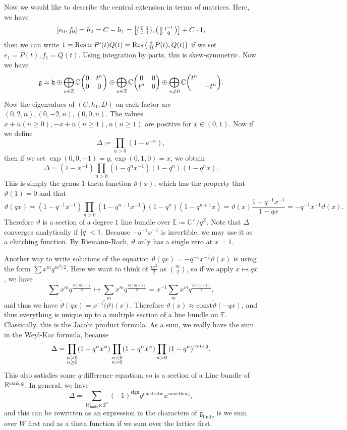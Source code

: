 \documentclass[leqno, openany]{memoir}
\theoremstyle{definition}
\theoremstyle{remark}
\theoremstyle{plain}
\theoremstyle{definition}
\theoremstyle{remark}
\newcommand{\C}{\mathbb{C}}
\newcommand{\Z}{\mathbb{Z}}
\newcommand{\E}{\mathbb{E}}
\newcommand{\mf}[1]{\mathfrak{#1}}
\newcommand{\mr}[1]{\mathrm{#1}}
\newcommand{\wtl}[1]{\widetilde{#1}}
\begin{document}
Now we would like to describe the central extension in terms of matrices. Here, we have
\[ [e_0, f_0] = h_0 = C - h_1 = \qty[ \begin{psmallmatrix} 0 & 0 \\ t & 0 \end{psmallmatrix}, \begin{psmallmatrix} 0 & t^{-1} \\ 0 & 0 \end{psmallmatrix}] + C \cdot 1, \]
then we can write $1 = \Res \tr P'(t) Q(t) = \Res \qty( \dv{t} P(t), Q(t) )$ if we set $e_1 = P(t), f_1 = Q(t)$. Using integration by parts, this is skew-symmetric. Now we have
\[ \mf{g} = \mf{h} \oplus \bigoplus_{n \in \Z} \C \mqty(0 & t^n \\ 0 & 0) \oplus \bigoplus_{n \in \Z} \C \mqty(0 & 0 \\ t^n & 0) \oplus \bigoplus_{n \neq 0} \C \mqty( \dmat{t^n,-t^n} ). \]
Now the eigenvalues of $(C, h_1, D)$ on each factor are $(0, 2,n), (0, -2, n), (0, 0,n)$. The values $x+n (n \geq 0), -x+n (n \geq 1), n (n \geq 1)$ are positive for $x \in (0,1)$. Now if we define
\[ \Delta \coloneqq \prod_{\alpha > 0} (1-e^{-\alpha}), \]
then if we set $\exp(0,0,-1) = q, \exp(0,1,0) = x$, we obtain
\[ \Delta = (1-x^{-1}) \prod_{n>0} (1-q^n x^{-1}) (1-q^n) (1-q^n x). \]
This is simply the genus $1$ theta function $\vartheta(x)$, which has the property that $\vartheta(1) = 0$ and that
\[ \vartheta(qx) = (1-q^{-1}x^{-1}) \prod_{n>0} (1-q^{n-1}x^{-1})(1-q^n)(1-q^{n+1}x) = \vartheta(x) \frac{1-q^{-1}x^{-1}}{1-qx} = -q^{-1}x^{-1} \vartheta(x). \]
Therefore $\vartheta$ is a section of a degree $1$ line bundle over $\E \coloneqq \C^{\times} / q^{\Z}$. Note that $\Delta$ converges analytically if $\abs{q} < 1$. Because $-q^{-1} x^{-1}$ is invertible, we may use it as a clutching function. By Riemann-Roch, $\vartheta$ only has a single zero at $x=1$.

Another way to write solutions of the equation $\vartheta(qx) = -q^{-1}x^{-1} \vartheta(x)$ is using the form $\sum x^m q^{m^2/2}$. Here we want to think of $\frac{m^2}{2}$ as $\binom{m}{2}$, so if we apply $x \mapsto qx$, we have
\[ \sum x^m q^{\frac{m(m-1)}{2}} \mapsto \sum_m x^m q^{\frac{m(m+1)}{2}} = x^{-1} \sum_m x^m q^{\frac{m(m-1)}{2}}, \]
and thus we have $\wtl{\vartheta}(qx) = x^{-1} \wtl(\vartheta)(x)$. Therefore $\vartheta(x) \approx \mr{const} \wtl{\vartheta}(-qx)$, and thus everything is unique up to a multiple section of a line bundle on $\E$. Classically, this is the Jacobi product formula. As a sum, we really have the sum in the Weyl-Kac formula, because
\[ \Delta = \prod_{\substack{\alpha>0 \\ n \geq 0}} (1-q^n x^{\alpha}) \prod_{\substack{\alpha<0 \\ n>0}} (1-q^n x^{\alpha}) \prod_{n > 0} {(1-q^n)}^{\rank \mf{g}}. \]
This also satisfies some $q$-difference equation, so is a section of a Line bundle of $\E^{\rank \mf{g}}$. In general, we have 
\[ \Delta = \sum_{W_{\mr{finite}} \ltimes \Z^r} {(-1)}^{\mr{sign}} q^{\text{quadratic}} x^{\text{something}}, \]
and this can be rewritten as an expression in the characters of $\mf{g}_{\text{finite}}$ is we sum over $W$ first and as a theta function if we sum over the lattice first.
\end{document}
